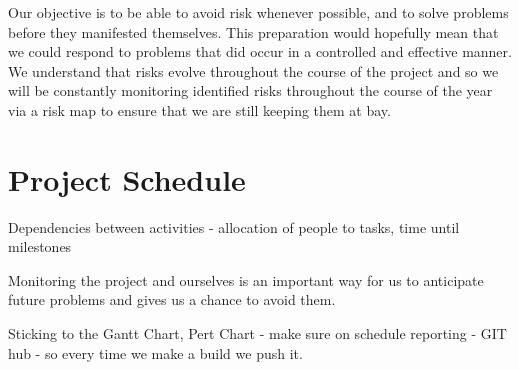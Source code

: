 \documentclass[a4paper,12pt]{article}
\begin{document}
Our objective is to be able to avoid risk whenever possible, and to solve problems before they manifested themselves. This preparation would hopefully mean that we could respond to problems that did occur in a controlled and effective manner. We understand that risks evolve throughout the course of the project and so we will be constantly monitoring identified risks throughout the course of the year via a risk map to ensure that we are still keeping them at bay. 

\section*{Project Schedule}

Dependencies between activities - allocation of people to tasks, time until milestones

Monitoring the project and ourselves is an important way for us to anticipate future problems and gives us a chance to avoid them.

Sticking to the Gantt Chart, Pert Chart - make sure on schedule reporting - GIT hub - so every time we make a build we push it.
\end{document}
